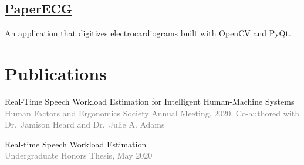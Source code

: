 \documentclass[12pt]{article} %
\let\defaultref\href
\renewcommand{\href}[2]{%
  \defaultref{#1}{\ul{#2}}%
}
\renewcommand{\emph}[1]{%
  \textcolor{gray}{#1}%
}
\begin{document}
\begin{paracol}{2}
\begin{raggedright}
\hypertarget{paperecg}{%
\subsection{\texorpdfstring{\href{https://github.com/Tereshchenkolab/paper-ecg}{PaperECG}}{PaperECG}}\label{paperecg}}

An application that digitizes electrocardiograms built with OpenCV and
PyQt.

\hypertarget{publications}{%
\section{Publications}\label{publications}}

\vspace{1pt}

Real-Time Speech Workload Estimation for Intelligent Human-Machine
Systems\\
\emph{Human Factors and Ergonomics Society Annual Meeting, 2020.
Co-authored with Dr.~Jamison Heard and Dr.~Julie A. Adams}

Real-time Speech Workload Estimation\\
\emph{Undergraduate Honors Thesis, May 2020}

\end{raggedright}
\end{paracol}
\end{document}
